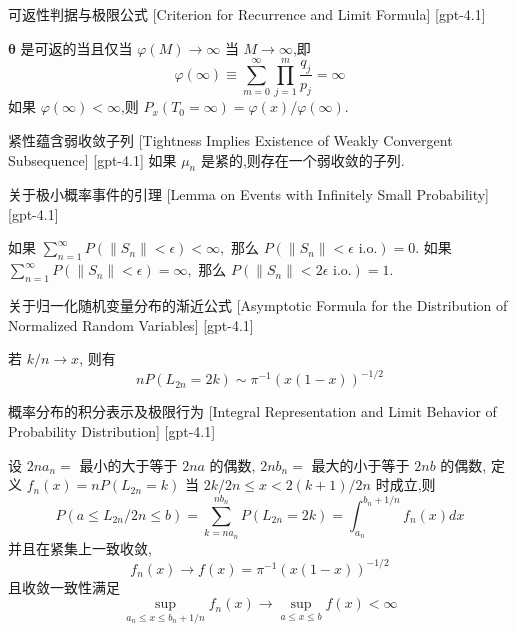 \documentclass[UTF8]{ctexart}
\begin{document}
    
    
    \begin{thm}
        {可返性判据与极限公式}
        [Criterion for Recurrence and Limit Formula]
        [gpt-4.1]
        
$\boldsymbol{\theta}$ 是可返的当且仅当 $\varphi(M) \to \infty$ 当 $M \to \infty$,即
\[
\varphi(\infty) \equiv \sum_{m=0}^{\infty} \prod_{j=1}^{m} \frac{q_j}{p_j} = \infty
\]
如果 $\varphi(\infty) < \infty$,则 $P_x(T_0 = \infty) = \varphi(x)/\varphi(\infty)$.

    \end{thm}
    
    
    
    \begin{thm}
        {紧性蕴含弱收敛子列}
        [Tightness Implies Existence of Weakly Convergent Subsequence]
        [gpt-4.1]
        如果 $\mu _ { n }$ 是紧的,则存在一个弱收敛的子列.
    \end{thm}
    
    
    
    \begin{lma}
        {关于极小概率事件的引理}
        [Lemma on Events with Infinitely Small Probability]
        [gpt-4.1]
        
如果 $\sum_{n=1}^{\infty} P(\|S_{n}\| < \epsilon) < \infty,$ 那么 $P(\|S_{n}\| < \epsilon \text{ i.o.}) = 0$.
如果 $\sum_{n=1}^{\infty} P(\|S_{n}\| < \epsilon) = \infty,$ 那么 $P(\|S_{n}\| < 2\epsilon \text{ i.o.}) = 1$.

    \end{lma}
    
    
    
    \begin{thm}
        {关于归一化随机变量分布的渐近公式}
        [Asymptotic Formula for the Distribution of Normalized Random Variables]
        [gpt-4.1]
        
若 $k/n \to x$, 则有
\[
n P(L_{2n} = 2k) \sim \pi^{-1} (x(1-x))^{-1/2}
\]

    \end{thm}
    
    
    
    \begin{thm}
        {概率分布的积分表示及极限行为}
        [Integral Representation and Limit Behavior of Probability Distribution]
        [gpt-4.1]
        
设 $2n a_n =$ 最小的大于等于 $2n a$ 的偶数, $2n b_n =$ 最大的小于等于 $2n b$ 的偶数, 定义 $f_n(x) = n P(L_{2n} = k)$ 当 $2k / 2n \leq x < 2(k+1)/2n$ 时成立,则
\[
P(a \leq L_{2n} / 2n \leq b) = \sum_{k = n a_n}^{n b_n} P(L_{2n} = 2k) = \int_{a_n}^{b_n + 1/n} f_n(x) dx
\]
并且在紧集上一致收敛,
\[
f_n(x) \to f(x) = \pi^{-1} (x(1-x))^{-1/2}
\]
且收敛一致性满足
\[
\sup_{a_n \leq x \leq b_n + 1/n} f_n(x) \to \sup_{a \leq x \leq b} f(x) < \infty
\]

    \end{thm}
    
\end{document}
